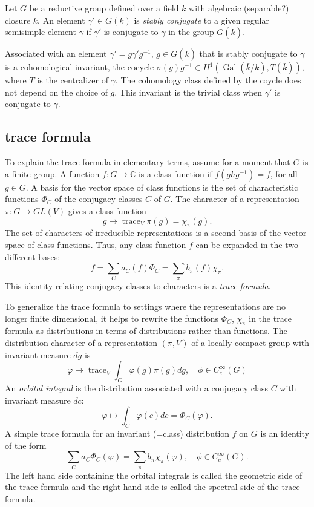 \documentclass[brochure,english,12pt]{bourbaki}
\def\op#1{{\operatorname{#1}}}
\newcommand{\ring}[1]{\mathbb{#1}}
\begin{document}
\begin{definition} Let $G$ be a reductive group defined over a field
  $k$ with algebraic (separable?) closure $\bar k$.  An element
  $\gamma'\in G(k)$ is {\it stably conjugate} to a given regular
  semisimple element $\gamma$ if $\gamma'$ is conjugate to $\gamma$ in
  the group $G(\bar k)$.
\end{definition}

Associated with an element $\gamma'=g\gamma' g^{-1}$, $g\in G(\bar k)$
that is stably conjugate to $\gamma$ is a cohomological invariant, the
cocycle $\sigma(g)g^{-1}\in H^1(\op{Gal}(\bar k/k),T(\bar k))$, where
$T$ is the centralizer of $\gamma$.  The cohomology class defined by
the coycle does not depend on the choice of $g$.  This invariant is the trivial
class when $\gamma'$ is conjugate to $\gamma$.

\subsection{trace formula}

To explain the trace formula in elementary terms, assume for a moment that
$G$ is a finite group.  A function  $f:G\to \ring{C}$ is a class function if
$f(g h g^{-1}) = f$, for all $g\in G$.  A basis for the vector space of class functions
is the set of characteristic functions $\Phi_C$ of the conjugacy classes $C$ of $G$. 
The character of a representation $\pi:G\to GL(V)$ gives a class function
\[
g \mapsto \op{trace}_V \pi(g) = \chi_\pi(g).
\]
The set of characters of irreducible representations is a second basis of the vector
space of class functions.  Thus, any class function $f$ can be expanded in the two different bases:
\[
f = \sum_C a_C(f) \Phi_C = \sum_{\pi} b_\pi(f) \chi_\pi.
\]
This identity relating conjugacy classes to characters is a {\it trace formula}.

To generalize the trace formula to settings where the representations are no longer
finite dimensional, it helps to rewrite the functions $\Phi_C$, $\chi_\pi$
in the trace formula as distributions in terms of distributions rather than functions.
The distribution character of a representation $(\pi,V)$ of a locally compact group with
invariant measure $dg$ is 
\[\varphi \mapsto \op{trace}_V \int_G \varphi(g)\pi(g) dg, \quad \phi\in C_c^\infty(G)
\]
An {\it orbital integral} is the distribution associated with a conjugacy class $C$ with
invariant measure $dc$:
\[
\varphi \mapsto\int_C \varphi(c) dc  = \Phi_C(\varphi).
\]
A simple trace formula for an invariant (=class) distribution $f$ on $G$ is an identity of the
form 
\[
 \sum_C a_C \Phi_C(\varphi) = \sum_{\pi} b_\pi \chi_\pi(\varphi),\quad  \phi\in C_c^\infty(G).
\]
The left hand side containing the orbital integrals is called the
geometric side of the trace formula and the right hand side is called
the spectral side of the trace formula.
\end{document}

